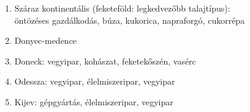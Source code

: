 \documentclass{article}
\begin{document}
\begin{enumerate}
    \item Száraz kontinentális (feketeföld: legkedvezőbb talajtípus): \\
    öntözéses gazdálkodás, búza, kukorica, napraforgó, cukorrépa
    \item Donyec-medence
    \item Doneck: vegyipar, kohászat, feketekőszén, vasérc
    \item Odessza: vegyipar, élelmiszeripar, vegyipar
    \item Kijev: gépgyártás, élelmiszeripar, vegyipar
\end{enumerate}
\end{document}
